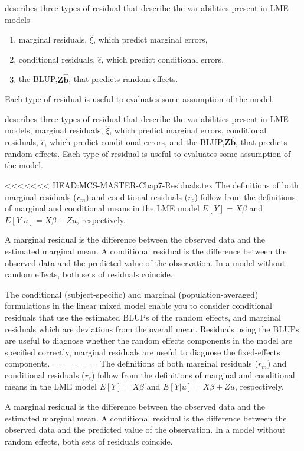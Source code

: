 \documentclass[12pt, a4paper]{report}
\theoremstyle{plain}
\theoremstyle{definition}
\theoremstyle{remark}
\begin{document}
\citet{PB} describes three types of residual that describe the variabilities
present in LME models
\begin{enumerate}
	\item marginal residuals, $\hat{\xi}$, which predict marginal errors,
	\item conditional residuals, $\hat{\epsilon}$, which predict conditional errors,
	\item the BLUP,$\boldsymbol{Z\hat{b}}$, that predicts random effects.
\end{enumerate}
Each type of residual is useful to evaluates some assumption of the model.
	
\citet{PB} describes three types of residual that describe the variabilities
present in LME models, marginal residuals, $\hat{\xi}$, which predict marginal errors, conditional residuals, $\hat{\epsilon}$, which predict conditional errors, and the BLUP,$\boldsymbol{Z\hat{b}}$, that predicts random effects.
Each type of residual is useful to evaluates some assumption of the model.
	
<<<<<<< HEAD:MCS-MASTER-Chap7-Residuals.tex
	The definitions of both marginal residuals ($r_m$) and conditional residuals ($r_c$) follow from the definitions of marginal and conditional means in the LME model 
	$E[{Y}] = {X}{\beta}$ and $E[{Y|u}] = {X}{\beta} + {Z}{u}$, respectively.
	
	A marginal residual is the difference between the observed data and the estimated marginal mean. A conditional residual is the difference between the observed data and the predicted value of the observation. In a model without random effects, both sets of residuals coincide.

	The conditional (subject-specific) and marginal (population-averaged) formulations in the linear mixed model enable you to consider conditional residuals that use the estimated BLUPs of the random effects, and marginal residuals which are deviations from the overall mean. Residuals using the BLUPs are useful to diagnose whether the random effects components in the model are specified correctly, marginal residuals are useful to diagnose the fixed-effects components.	
=======
The definitions of both marginal residuals ($r_m$) and conditional residuals ($r_c$) follow from the definitions of marginal and conditional means in the LME model 
	$E[{Y}] = {X}{\beta}$ and $E[{Y|{u}}] = {X}{\beta} + {Z}{u}$, respectively.
	
A marginal residual is the difference between the observed data and the estimated marginal mean. A conditional residual is the difference between the observed data and the predicted value of the observation. In a model without random effects, both sets of residuals coincide.
	
\end{document}
